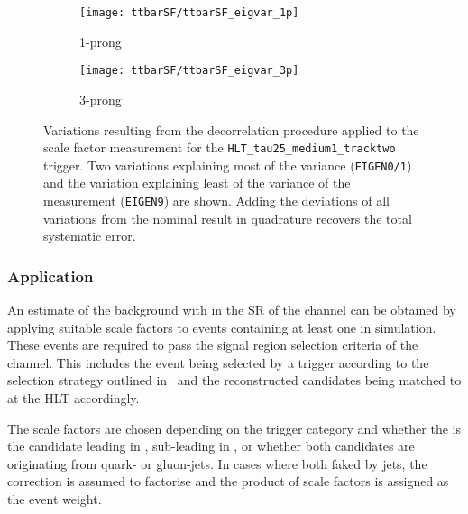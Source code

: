 \begin{figure}[htbp]
  \centering

  \begin{subfigure}[t]{.495\textwidth}
    \texttt{[image: ttbarSF/ttbarSF\_eigvar\_1p]}
    \caption{1-prong \tauhadvis}
    \label{fig:ttbarSF_eigenvariations_1p}
  \end{subfigure}\hfill%
  \begin{subfigure}[t]{.495\textwidth}
    \texttt{[image: ttbarSF/ttbarSF\_eigvar\_3p]}
    \caption{3-prong \tauhadvis}
    \label{fig:ttbarSF_eigenvariations_3p}
  \end{subfigure}

  \caption{Variations resulting from the decorrelation procedure
    applied to the \faketauhadvis scale factor measurement for the
    \texttt{HLT\_tau25\_medium1\_tracktwo} trigger. Two variations
    explaining most of the variance (\texttt{EIGEN0/1}) and the
    variation explaining least of the variance of the measurement
    (\texttt{EIGEN9}) are shown. Adding the deviations of all
    variations from the nominal result in quadrature recovers the
    total systematic error.}
  \label{fig:ttbarSF_eigenvariations}
\end{figure}


\subsubsection{Application}

An estimate of the \ttbar background with \faketauhadvis in the SR of
the \hadhad channel can be obtained by applying suitable scale factors
to events containing at least one \faketauhadvis in \ttbar simulation.
These events are required to pass the signal region selection criteria
of the \hadhad channel. This includes the event being selected by a
trigger according to the selection strategy outlined
in~ and the reconstructed \tauhadvis candidates
being matched to \tauhadvis at the HLT accordingly.

The scale factors are chosen depending on the trigger category and
whether the \faketauhadvis is the \tauhadvis candidate leading in \pT,
sub-leading in \pT, or whether both candidates are originating from
quark- or gluon-jets. In cases where both \tauhadvis faked by jets,
the correction is assumed to factorise and the product of scale
factors is assigned as the event weight.

